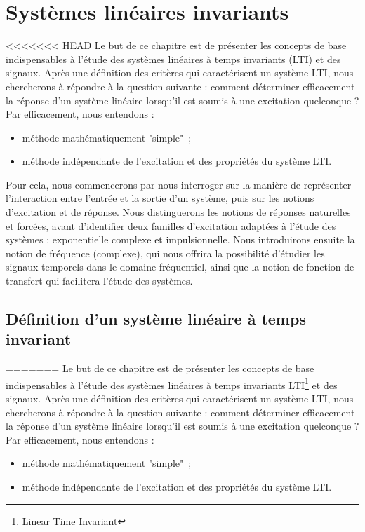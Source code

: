 \chapter{Systèmes linéaires invariants}
\label{chap:lti}
<<<<<<< HEAD
	Le but de ce chapitre est de présenter les concepts de base indispensables à l'étude des systèmes linéaires à temps invariants (LTI) et des signaux.
	Après une définition des critères qui caractérisent un système LTI, nous chercherons à répondre à la question suivante :
	comment déterminer efficacement la réponse d'un système linéaire lorsqu'il est soumis à une excitation quelconque ? Par efficacement, nous entendons :
	\begin{itemize}
		\item méthode mathématiquement "simple"~;
		\item méthode indépendante de l'excitation et des propriétés du système LTI.
	\end{itemize}

	
	Pour cela, nous commencerons par nous interroger sur la manière de représenter l'interaction entre l'entrée et la sortie d'un système, puis sur les notions d'excitation et de réponse. Nous distinguerons les notions de réponses naturelles et forcées, avant d'identifier deux familles d'excitation adaptées à l'étude des systèmes : exponentielle complexe et impulsionnelle. Nous introduirons ensuite la notion de fréquence (complexe), qui nous offrira la possibilité d'étudier les signaux temporels dans le domaine fréquentiel, ainsi que la notion de fonction de transfert qui facilitera l'étude des systèmes.
	
	
	\section{Définition d'un système linéaire à temps invariant}
=======
Le but de ce chapitre est de présenter les concepts de base
indispensables à l'étude des systèmes linéaires à temps invariants
LTI\footnote{ Linear Time Invariant} et des signaux.  Après une
définition des critères qui caractérisent un système LTI, nous
chercherons à répondre à la question suivante : comment déterminer
efficacement la réponse d'un système linéaire lorsqu'il est soumis à
une excitation quelconque ?  Par efficacement, nous entendons :
\begin{itemize}
\item méthode mathématiquement "simple"~;
\item méthode indépendante de l'excitation et des propriétés du
  système LTI.
\end{itemize}


